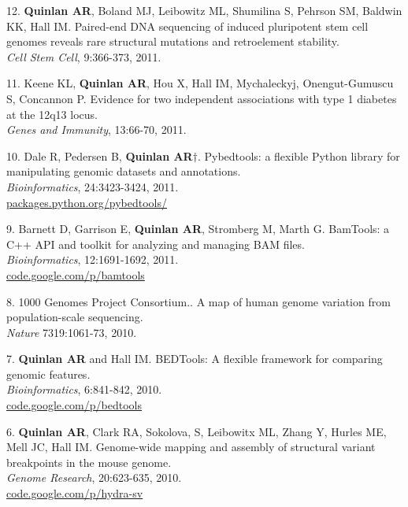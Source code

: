 \documentclass[margin,line]{cv}
\begin{document}
\begin{resume}
\begin{list}{*}{}
    \item[12.] \textbf{Quinlan AR}, Boland MJ, Leibowitz ML, Shumilina S, Pehrson SM, Baldwin KK, Hall IM. 
    Paired-end DNA sequencing of induced pluripotent stem cell genomes reveals 
    rare structural mutations and retroelement stability.\\
    \textit{Cell Stem Cell}, 9:366-373, 2011.
    
    \item[11.] Keene KL, \textbf{Quinlan AR}, Hou X, Hall IM, Mychaleckyj, Onengut-Gumuscu S, Concannon P.
    Evidence for two independent associations with type 1 diabetes at the 12q13 locus.\\
    \textit{Genes and Immunity}, 13:66-70, 2011.

    \item[10.] Dale R, Pedersen B, \textbf{Quinlan AR}$\dagger$. 
    Pybedtools: a flexible Python library for manipulating genomic datasets and annotations.\\
    \textit{Bioinformatics}, 24:3423-3424, 2011.\\
    \url{packages.python.org/pybedtools/}
    
    \item[9.] Barnett D, Garrison E, \textbf{Quinlan AR}, Stromberg M, Marth G.
    BamTools: a C++ API and toolkit for analyzing and managing BAM files.\\
    \textit{Bioinformatics}, 12:1691-1692, 2011.\\
    \url{code.google.com/p/bamtools}

    \item[8.] 1000 Genomes Project Consortium.. 
    A map of human genome variation from population-scale sequencing.\\ 
    \textit{Nature} 7319:1061-73, 2010.

    \item[7.] \textbf{Quinlan AR} and Hall IM.
    BEDTools: A flexible framework for comparing genomic features.\\ 
    \textit{Bioinformatics}, 6:841-842, 2010.\\
    \url{code.google.com/p/bedtools}

    \item[6.] \textbf{Quinlan AR}, Clark RA, Sokolova, S, Leibowitx ML, Zhang Y, Hurles ME, Mell JC, Hall IM. 
    Genome-wide mapping and assembly of structural variant breakpoints in the mouse genome.\\
    \textit{Genome Research}, 20:623-635, 2010.\\
    \url{code.google.com/p/hydra-sv}


\end{list}
\end{resume}
\end{document}
